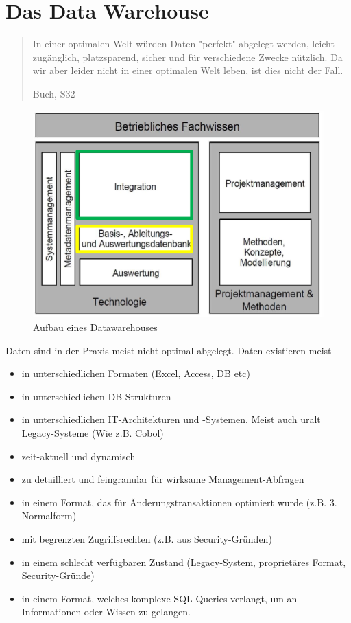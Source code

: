 \documentclass[a4paper, 11pt, nofootinbib]{article}
\begin{document}
\section{Das Data Warehouse}

\blockquote[Buch, S32]{In einer optimalen Welt würden Daten "perfekt" abgelegt werden, leicht zugänglich, platzsparend, sicher und für verschiedene Zwecke nützlich. Da wir aber leider nicht in einer optimalen Welt leben, ist dies nicht der Fall.}
\vspace{10px}


\begin{figure}
	\centering
	\includegraphics[keepaspectratio=true,height=10\baselineskip]{datawarehouse.PNG}
	\caption{Aufbau eines Datawarehouses}
	\label{fig:datawarehouse}
\end{figure}

Daten sind in der Praxis meist nicht optimal abgelegt. Daten existieren meist
\begin{itemize}
	\item in unterschiedlichen Formaten (Excel, Access, DB etc)
	\item in unterschiedlichen DB-Strukturen 
	\item in unterschiedlichen IT-Architekturen und -Systemen. Meist auch uralt Legacy-Systeme (Wie z.B. Cobol)
	\item zeit-aktuell und dynamisch
	\item zu detailliert und feingranular für wirksame Management-Abfragen
	\item in einem Format, das für Änderungstransaktionen optimiert wurde (z.B. 3. Normalform)
	\item mit begrenzten Zugriffsrechten (z.B. aus Security-Gründen)
	\item in einem schlecht verfügbaren Zustand (Legacy-System, proprietäres Format, Security-Gründe)
	\item in einem Format, welches komplexe SQL-Queries verlangt, um an Informationen oder Wissen zu gelangen.
\end{itemize}
\end{document}
